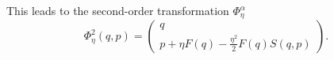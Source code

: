 %
This leads to the second-order transformation $\Phi_\eta^\alpha$
%
\begin{equation}
	\Phi_\eta^2(q,p) = 
	\begin{pmatrix}
 	  q \\ p + \eta F(q) - \frac{\eta^2}{2}F(q)S(q,p)
 	\end{pmatrix}.
\end{equation}
%

